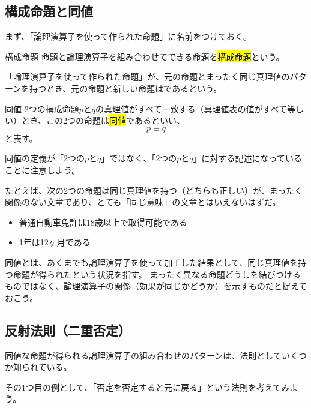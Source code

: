 \documentclass[../../imaging-math]{subfiles}
\begin{document}
\subsection{構成命題と同値}

まず、「論理演算子を使って作られた命題」に名前をつけておく。

\begin{definition}{構成命題}
  命題と論理演算子を組み合わせてできる命題を\hl{構成命題}という。
\end{definition}

「論理演算子を使って作られた命題」が、元の命題とまったく同じ真理値のパターンを持つとき、元の命題と新しい命題はであるという。

\begin{definition}{同値}
  \titlegap
  2つの構成命題$p$と$q$の真理値がすべて一致する（真理値表の値がすべて等しい）とき、この2つの命題は\hl{同値}であるといい、
  \LARGE
  \begin{equation*}
    p \equiv q
  \end{equation*}
  \normalsize
  と表す。
\end{definition}

同値の定義が「2つの$p$と$q$」ではなく、「2つの$p$と$q$」に対する記述になっていることに注意しよう。

\br

たとえば、次の2つの命題は同じ真理値を持つ（どちらも正しい）が、まったく関係のない文章であり、とても「同じ意味」の文章とはいえないはずだ。

\begin{itemize}
  \item 普通自動車免許は18歳以上で取得可能である
  \item 1年は12ヶ月である
\end{itemize}

同値とは、あくまでも論理演算子を使って加工した結果として、同じ真理値を持つ命題が得られたという状況を指す。
まったく異なる命題どうしを結びつけるものではなく、論理演算子の関係（効果が同じかどうか）を示すものだと捉えておこう。

\subsection{反射法則（二重否定）}

同値な命題が得られる論理演算子の組み合わせのパターンは、法則としていくつか知られている。

\br

その1つ目の例として、「否定を否定すると元に戻る」という法則を考えてみよう。
\end{document}
